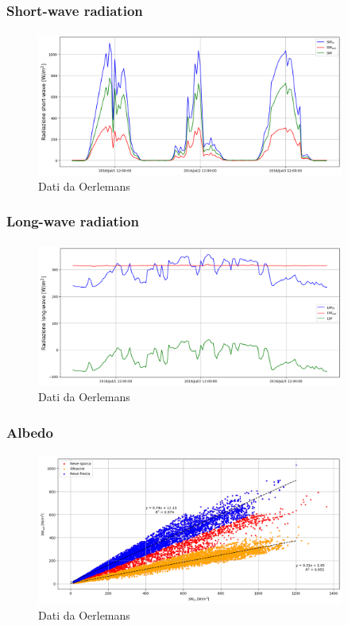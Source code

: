 \begin{frame}
    \frametitle{Short-wave radiation}
    \framesubtitle{}

    \begin{figure}
        \includegraphics[width=0.9\textwidth]{Immagini/shortWave.png}
        \caption{Dati da Oerlemans}
    \end{figure}
  
\end{frame}


\begin{frame}
    \frametitle{Long-wave radiation}
    \framesubtitle{}

    \begin{figure}
        \includegraphics[width=0.9\textwidth]{Immagini/longWave.png}
        \caption{Dati da Oerlemans}
    \end{figure}
  
\end{frame}


\begin{frame}
    \frametitle{Albedo}
    \framesubtitle{}

    \begin{figure}
        \includegraphics[width=0.9\textwidth]{Immagini/albedoHour.png}
        \caption{Dati da Oerlemans}
    \end{figure}
  
\end{frame}


